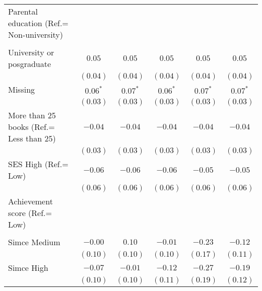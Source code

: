 \documentclass[
  12pt,
  letterpaper,
]{article}
\begin{document}
\begin{table}
{\begin{center}
{\begin{threeparttable}
\begin{tabular}{l c c c c c}
Parental education (Ref.= Non-university) &               &               &               &               &               \\
                                          &               &               &               &               &               \\
\quad University or posgraduate           & $0.05$        & $0.05$        & $0.05$        & $0.05$        & $0.05$        \\
                                          & $(0.04)$      & $(0.04)$      & $(0.04)$      & $(0.04)$      & $(0.04)$      \\
\quad Missing                             & $0.06^{*}$    & $0.07^{*}$    & $0.06^{*}$    & $0.07^{*}$    & $0.07^{*}$    \\
                                          & $(0.03)$      & $(0.03)$      & $(0.03)$      & $(0.03)$      & $(0.03)$      \\
More than 25 books (Ref.= Less than 25)   & $-0.04$       & $-0.04$       & $-0.04$       & $-0.04$       & $-0.04$       \\
                                          & $(0.03)$      & $(0.03)$      & $(0.03)$      & $(0.03)$      & $(0.03)$      \\
SES High (Ref.= Low)                      & $-0.06$       & $-0.06$       & $-0.06$       & $-0.05$       & $-0.05$       \\
                                          & $(0.06)$      & $(0.06)$      & $(0.06)$      & $(0.06)$      & $(0.06)$      \\
Achievement score (Ref.= Low)             &               &               &               &               &               \\
                                          &               &               &               &               &               \\
\quad Simce Medium                        & $-0.00$       & $0.10$        & $-0.01$       & $-0.23$       & $-0.12$       \\
                                          & $(0.10)$      & $(0.10)$      & $(0.10)$      & $(0.17)$      & $(0.11)$      \\
\quad Simce High                          & $-0.07$       & $-0.01$       & $-0.12$       & $-0.27$       & $-0.19$       \\
                                          & $(0.10)$      & $(0.10)$      & $(0.11)$      & $(0.19)$      & $(0.12)$      \\

\end{tabular}
\end{threeparttable}}
\end{center}}
\end{table}
\end{document}

